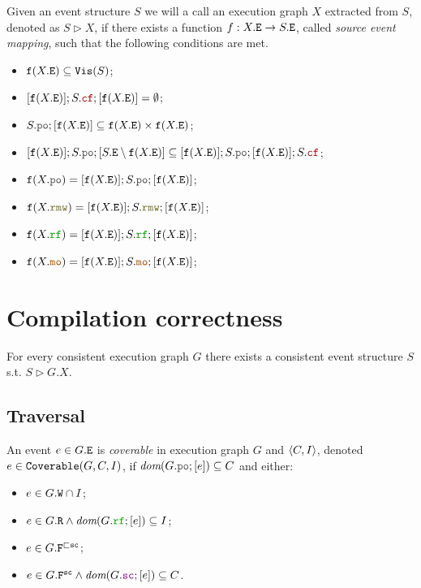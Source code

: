 \documentclass[12pt]{article}
\begin{document}
\begin{definition}
  Given an event structure $S$ we will a call an execution graph $X$
  extracted from $S$, denoted as $S \rhd X$,
  if there exists a function $f : X.{\mathtt{E}} \rightarrow S.{\mathtt{E}}$, called \emph{source event mapping},
  such that the following conditions are met.
  \begin{itemize}
    \item ${\mathtt{f}}(X.{\mathtt{E}}) \subseteq {\mathtt{Vis}}(S)$;
    \item $[\lf(X.\lE)];S.\lCF;[\lf(X.\lE)] = \emptyset$;
    \item $S.\lPO;[\lf(X.\lE)] \subseteq \lf(X.\lE) \times \lf(X.\lE)$;
    \item $[\lf(X.\lE)];S.\lPO;[S.\lE \setminus \lf(X.\lE)] \subseteq
           [\lf(X.\lE)];S.\lPO;[\lf(X.\lE)];S.\lCF$;
    \item $\lf(X.\lPO)  = [\lf(X.\lE)];S.\lPO; [\lf(X.\lE)]$;
    \item $\lf(X.\lRMW) = [\lf(X.\lE)];S.\lRMW;[\lf(X.\lE)]$;
    \item $\lf(X.\lRF)  = [\lf(X.\lE)];S.\lRF; [\lf(X.\lE)]$;
    \item $\lf(X.\lMO)  = [\lf(X.\lE)];S.\lMO; [\lf(X.\lE)]$;
  \end{itemize}
\end{definition}

\section{Compilation correctness}

\begin{theorem}
  For every consistent \imm execution graph $G$
  there exists a consistent event structure $S$
  s.t. $S \rhd G.X$.
\end{theorem}

\subsection{Traversal}

\begin{definition}
  An event $e \in G.{\mathtt{E}}$ is \emph{coverable} in \imm execution graph $G$ and $\langle C, I \rangle$,
  denoted $e \in {\mathtt{Coverable}}(G, C, I)$, 
  if $\dom{G.\lPO;[e]} \subseteq C$ and either:
  \begin{itemize}
    \item $e \in G.{\mathtt{W}} \cap I$;
    \item $e \in G.\lR \wedge \dom{G.\lRF;[e]} \subseteq I$;
    \item $e \in G.{\mathtt{F}}^{\sqsubset{\mathtt{sc}}}$;
    \item $e \in G.\lF^{\sco} \wedge \dom{G.\lSC;[e]} \subseteq C$.
  \end{itemize}
\end{definition}
\end{document}
